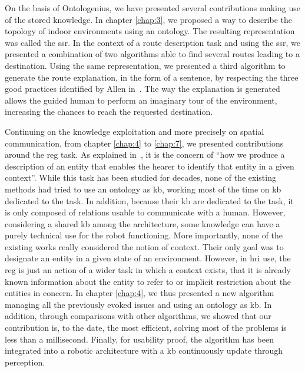 On the basis of Ontologenius, we have presented several contributions making use of the stored knowledge. In chapter \ref{chap:3}, we proposed a way to describe the topology of indoor environments using an ontology. The resulting representation was called the \acrfull{ssr}. In the context of a route description task and using the \acrshort{ssr}, we presented a combination of two algorithms able to find several routes leading to a destination. Using the same representation, we presented a third algorithm to generate the route explanation, in the form of a sentence, by respecting the three good practices identified by Allen in~\cite{allen_2000_principles}. The way the explanation is generated allows the guided human to perform an imaginary tour of the environment, increasing the chances to reach the requested destination.

Continuing on the knowledge exploitation and more precisely on spatial communication, from chapter \ref{chap:4} to \ref{chap:7}, we presented contributions around the \acrfull{reg} task. As explained in~\cite{reiter_2000_building}, it is the concern of ``how we produce a description of an entity that enables the hearer to identify that entity in a given context''. While this task has been studied for decades, none of the existing methods had tried to use an ontology as \acrshort{kb}, working most of the time on \acrshort{kb} dedicated to the task. In addition, because their \acrshort{kb} are dedicated to the task, it is only composed of relations usable to communicate with a human. However, considering a shared \acrshort{kb} among the architecture, some knowledge can have a purely technical use for the robot functioning. More importantly, none of the existing works really considered the notion of context. Their only goal was to designate an entity in a given state of an environment. However, in \acrshort{hri} use, the \acrshort{reg} is just an action of a wider task in which a context exists, that it is already known information about the entity to refer to or implicit restriction about the entities in concern. In chapter \ref{chap:4}, we thus presented a new algorithm managing all the previously evoked issues and using an ontology as \acrshort{kb}. In addition, through comparisons with other algorithms, we showed that our contribution is, to the date, the most efficient, solving most of the problems is less than a millisecond. Finally, for usability proof, the algorithm has been integrated into a robotic architecture with a \acrshort{kb} continuously update through perception.

